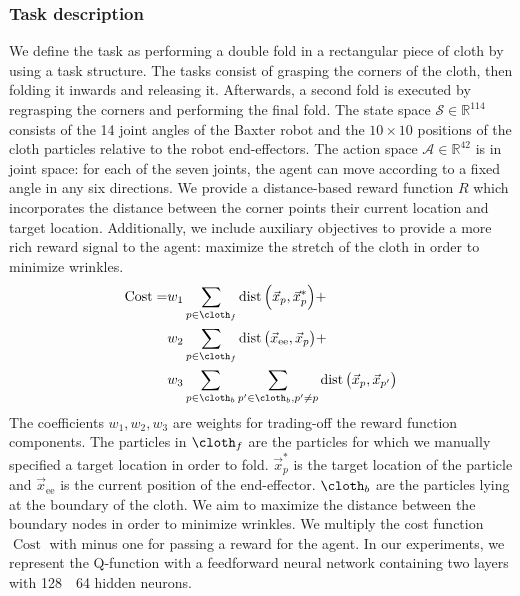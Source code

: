 \documentclass[\home/main.tex]{subfiles}
\begin{document}
\subsubsection{Task description}
We define the task as performing a double fold in a rectangular piece of cloth by using a task structure. The tasks consist of grasping the corners of the cloth, then folding it inwards and releasing it. Afterwards, a second fold is executed by regrasping the corners and performing the final fold.
The state space $\mathcal{S} \in \mathbb{R}^{114}$ consists of the 14 joint angles of the Baxter robot and the $10 \times 10$ positions of the cloth particles relative to the robot end-effectors.
The action space $\mathcal{A} \in \mathbb{R}^{42}$ is in joint space: for each of the seven joints, the agent can move according to a fixed angle in any six directions.
We provide a distance-based reward function $R$ which incorporates the distance between the corner points their current location and target location. Additionally, we include auxiliary objectives to provide a more rich reward signal to the agent: maximize the stretch of the cloth in order to minimize wrinkles.
\begin{align} \label{eq:sim_cost_function}
    \operatorname{Cost} = & w_1 \sum_{p \in \cloth_f} \operatorname{dist}{\left( \vec{x}_p , \vec{x}_{p}^{*} \right)} + \nonumber                                            \\
                          & w_2 \sum_{p \in \cloth_f} \operatorname{dist}{\left( \vec{x}_{\text{ee}} , \vec{x}_{p} \right)} + \nonumber                                      \\
                          & w_3 \sum_{p \in \cloth_b} \sum_{p^{\prime} \in \cloth_b, p^{\prime} \neq p} \operatorname{dist}{\left( \vec{x}_p , \vec{x}_{p^{\prime}} \right)}
\end{align}
The coefficients $w_1,w_2, w_3$ are weights for trading-off the reward function components. The particles in $\cloth_f$ are the particles for which we manually specified a target location in order to fold. $\vec{x}_{p}^{*}$ is the target location of the particle and $\vec{x}_{\text{ee}}$ is the current position of the end-effector. $\cloth_b$ are the particles lying at the boundary of the cloth. We aim to maximize the distance between the boundary nodes in order to minimize wrinkles.
We multiply the cost function $\operatorname{Cost}$ with minus one for passing a reward for the agent.
In our experiments, we represent the Q-function with a feedforward neural network containing two layers with 128~\texttimes~64 hidden neurons.
\end{document}
